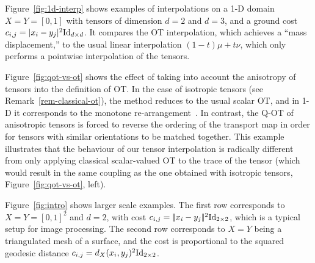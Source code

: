 Figure~\ref{fig:1d-interp} shows examples of interpolations on a 1-D domain $X=Y=[0,1]$ with tensors of dimension $d=2$ and $d=3$, and a ground cost $c_{i,j}=|x_i-y_j|^2\mathrm{Id}_{d \times d}$. It compares the OT interpolation, which achieves a ``mass displacement,'' to the usual linear interpolation $(1-t)\mu+t\nu$, which only performs a pointwise interpolation of the tensors. 

Figure~\ref{fig:qot-vs-ot} shows the effect of taking into account the anisotropy of tensors into the definition of OT. In the case of isotropic tensors (see Remark~\ref{rem-classical-ot}), the method reduces to the usual scalar OT, and in 1-D it corresponds to the monotone re-arrangement~\cite{santambrogio2015optimal}. In contrast, the Q-OT of anisotropic tensors is forced to reverse the ordering of the transport map in order for tensors with similar orientations to be matched together. 
%
This example illustrates that the behaviour of our tensor interpolation is radically different from only applying classical scalar-valued OT to the trace of the tensor (which would result in the same coupling as the one obtained with isotropic tensors, Figure~\ref{fig:qot-vs-ot}, left). 

Figure~\ref{fig:intro} shows larger scale examples. 
%
The first row corresponds to $X=Y=[0,1]^2$ and $d=2$, with cost $c_{i,j}=|\!| x_i-y_j |\!|^2\mathrm{Id}_{2 \times 2}$, which is a typical setup for image processing.
%
The second row corresponds to $X=Y$ being a triangulated mesh of a surface, and the cost is proportional to the squared geodesic distance $c_{i,j}=d_X(x_i,y_j)^2 \mathrm{Id}_{2\times 2}$. 



